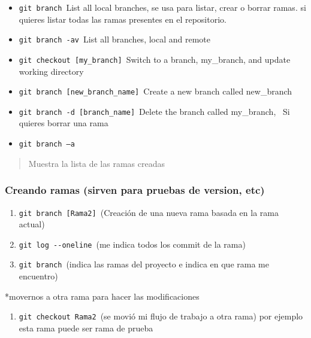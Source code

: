 \documentclass[
  a2paper,
]{article}
\providecommand{\tightlist}{%
  \setlength{\itemsep}{0pt}\setlength{\parskip}{0pt}}\usepackage{longtable,booktabs,array}
\begin{document}
\begin{itemize}
\item
  \texttt{git\ branch}~List all local branches, se usa para listar,
  crear o borrar ramas. si quieres listar todas las ramas presentes en
  el repositorio.
\item
  \texttt{git\ branch\ -av}~List all branches, local and remote
\item
  \texttt{git\ checkout\ {[}my\_branch{]}}~Switch to a branch,
  my\_branch, and update working directory~~
\item
  \texttt{git\ branch\ {[}new\_branch\_name{]}}~Create a new branch
  called new\_branch~~
\item
  \texttt{git\ branch\ -d\ {[}branch\_name{]}}~Delete the branch called
  my\_branch,~ Si quieres borrar una rama
\item
  \texttt{git\ branch\ –a}
\end{itemize}

\begin{quote}
Muestra la lista de las ramas creadas
\end{quote}

\hypertarget{creando-ramas-sirven-para-pruebas-de-version-etc}{%
\subsubsection{Creando ramas (sirven para pruebas de version,
etc)}\label{creando-ramas-sirven-para-pruebas-de-version-etc}}

\begin{enumerate}
\def\labelenumi{\arabic{enumi}.}
\tightlist
\item
  \texttt{git\ branch~{[}Rama2{]}}~(Creación de una nueva rama basada en
  la rama actual)
\item
  \texttt{git\ log\ -\/-oneline}~(me indica todos los commit de la rama)
\item
  \texttt{git\ branch}~(indica las ramas del proyecto e indica en que
  rama me encuentro)
\end{enumerate}

*movernos a otra rama para hacer las modificaciones

\begin{enumerate}
\def\labelenumi{\arabic{enumi}.}
\setcounter{enumi}{3}
\tightlist
\item
  \texttt{git\ checkout\ Rama2}~(se movió mi flujo de trabajo a otra
  rama) por ejemplo esta rama puede ser rama de prueba
\end{enumerate}
\end{document}
